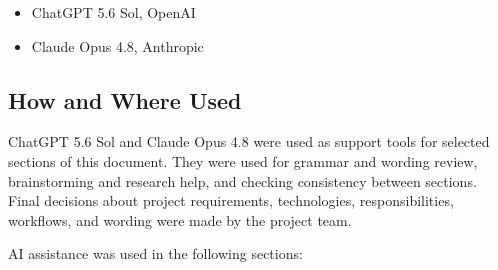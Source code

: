\documentclass{article}
\begin{document}
\begin{itemize}
    \item ChatGPT 5.6 Sol, OpenAI
    \item Claude Opus 4.8, Anthropic
\end{itemize}

\subsection{How and Where Used}

ChatGPT 5.6 Sol and Claude Opus 4.8 were used as support tools for selected sections of this
document. They were used for grammar and wording review, brainstorming and research help,
and checking consistency between sections. Final decisions about project requirements,
technologies, responsibilities, workflows, and wording were made by the project team.

AI assistance was used in the following sections:
\end{document}
